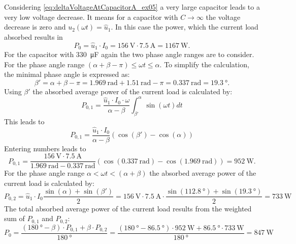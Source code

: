 \begin{solutionblock}
    Considering \eqref{eq:deltaVoltageAtCapacitorA_ex05} a very large capacitor leads to a very low voltage decrease. It means for
    a capacitor with $C\rightarrow \infty$ the voltage decrease is zero and $u_\mathrm{2}(\omega t)=\hat{u}_\mathrm{1}$. 
    In this case the power, which the current load absorbed results in
    \begin{equation} 
        P_\mathrm{0}=\hat{u}_\mathrm{1} \cdot I_{\mathrm{0}}=\SI{156}{\volt}\cdot\SI{7.5}{\ampere}=\SI{1167}{\watt}.
    \end{equation}
    For the capacitor with \SI{330}{\micro\farad} again the two phase angle ranges are to consider. For the phase angle range
    $(\alpha+\beta-\pi)\leq\omega t\leq\alpha$. To simplify the calculation, the minimal phase angle is expressed as:
    \begin{equation} 
        \beta'=\alpha+\beta-\pi=\SI{1.969}{\radian}+\SI{1.51}{\radian}-\pi
        =\SI{0.337}{\radian} = \SI{19.3}{\degree}.
    \end{equation}
    Using $\beta'$ the absorbed average power of the current load is calculated by:
    \begin{equation} 
        P_\mathrm{0,1}=\frac{\hat{u}_\mathrm{1} \cdot I_{\mathrm{0}} \cdot \omega}{\alpha-\beta} \int_{\beta'}^{\alpha} \sin(\omega t) dt
    \end{equation}
    This leads to
    \begin{equation} 
        P_\mathrm{0,1}=\frac{\hat{u}_\mathrm{1} \cdot I_{\mathrm{0}}}{\alpha-\beta} \left( \cos(\beta') - \cos(\alpha) \right)
    \end{equation}
    Entering numbers leads to
    \begin{equation} 
        P_\mathrm{0,1}=\frac{\SI{156}{\volt} \cdot \SI{7.5}{\ampere}}{\SI{1.969}{\radian}-\SI{0.337}{\radian}}
         \left( \cos(\SI{0.337}{\radian}) - \cos(\SI{1.969}{\radian}) \right)=\SI{952}{\watt}.
    \end{equation}
    For the phase angle range $\alpha<\omega t<(\alpha+\beta)$ the absorbed average power of the current load is calculated by:
    \begin{equation} 
        P_\mathrm{0,2}=\hat{u}_\mathrm{1} \cdot I_{\mathrm{0}} \frac{\sin(\alpha) + \sin(\beta')}{2}=
        \SI{156}{\volt} \cdot \SI{7.5}{\ampere} \cdot \frac{\sin(\SI{112.8}{\degree}) + \sin(\SI{19.3}{\degree})}{2}=
        \SI{733}{\watt}
    \end{equation}
    The total absorbed average power of the current load results from the weighted sum of $P_\mathrm{0,1}$ and $P_\mathrm{0,2}$:
    \begin{equation} 
        P_\mathrm{0}=\frac{(\SI{180}{\degree}-\beta) \cdot P_\mathrm{0,1}+ \beta \cdot P_\mathrm{0,2}}{\SI{180}{\degree}}
        =\frac{(\SI{180}{\degree}-\SI{86.5}{\degree}) \cdot \SI{952}{\watt}+\SI{86.5}{\degree} \cdot \SI{733}{\watt}}{\SI{180}{\degree}}=\SI{847}{\watt}
    \end{equation}
    

\end{solutionblock}
